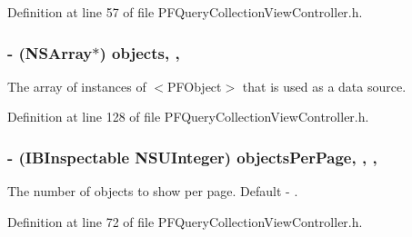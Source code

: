 Definition at line 57 of file P\+F\+Query\+Collection\+View\+Controller.\+h.

\hypertarget{interface_p_f_query_collection_view_controller_a97138630bccda46aa8acdd0fd460b42a}{}
\subsubsection[{objects}]{\setlength{\rightskip}{0pt plus 5cm}-\/ (N\+S\+Array$\ast$) objects\hspace{0.3cm}{\ttfamily [read]}, {\ttfamily [nonatomic]}, {\ttfamily [copy]}}\label{interface_p_f_query_collection_view_controller_a97138630bccda46aa8acdd0fd460b42a}
The array of instances of $<$\+P\+F\+Object$>$ that is used as a data source. 

Definition at line 128 of file P\+F\+Query\+Collection\+View\+Controller.\+h.

\hypertarget{interface_p_f_query_collection_view_controller_afb8b2f184f0eff2f763f2e77aae9dd0b}{}
\subsubsection[{objects\+Per\+Page}]{\setlength{\rightskip}{0pt plus 5cm}-\/ (I\+B\+Inspectable N\+S\+U\+Integer) objects\+Per\+Page\hspace{0.3cm}{\ttfamily [read]}, {\ttfamily [write]}, {\ttfamily [nonatomic]}, {\ttfamily [assign]}}\label{interface_p_f_query_collection_view_controller_afb8b2f184f0eff2f763f2e77aae9dd0b}
The number of objects to show per page. Default -\/ {}. 

Definition at line 72 of file P\+F\+Query\+Collection\+View\+Controller.\+h.

\hypertarget{interface_p_f_query_collection_view_controller_a28c0a0d62e1c36a171f19dac89b5fe82}{}
